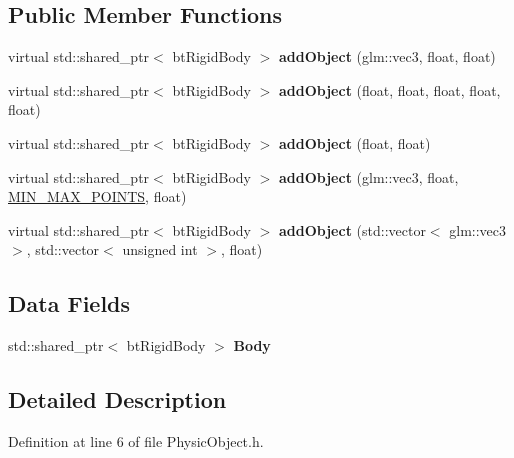 \subsection*{Public Member Functions}
\begin{DoxyCompactItemize}
\item 
virtual std\+::shared\+\_\+ptr$<$ bt\+Rigid\+Body $>$ {\bfseries add\+Object} (glm\+::vec3, float, float)\hypertarget{class_physics_1_1_physic_object_a64f5181be092b85b1f34bf542b94780a}{}\label{class_physics_1_1_physic_object_a64f5181be092b85b1f34bf542b94780a}

\item 
virtual std\+::shared\+\_\+ptr$<$ bt\+Rigid\+Body $>$ {\bfseries add\+Object} (float, float, float, float, float)\hypertarget{class_physics_1_1_physic_object_a0cff2f47921a688ca5d1355075a94a40}{}\label{class_physics_1_1_physic_object_a0cff2f47921a688ca5d1355075a94a40}

\item 
virtual std\+::shared\+\_\+ptr$<$ bt\+Rigid\+Body $>$ {\bfseries add\+Object} (float, float)\hypertarget{class_physics_1_1_physic_object_a2a57f444c58cbe27ed873ed64bf2efaa}{}\label{class_physics_1_1_physic_object_a2a57f444c58cbe27ed873ed64bf2efaa}

\item 
virtual std\+::shared\+\_\+ptr$<$ bt\+Rigid\+Body $>$ {\bfseries add\+Object} (glm\+::vec3, float, \hyperlink{struct_m_i_n___m_a_x___p_o_i_n_t_s}{M\+I\+N\+\_\+\+M\+A\+X\+\_\+\+P\+O\+I\+N\+TS}, float)\hypertarget{class_physics_1_1_physic_object_aee5783cf9855d98a6218f1311effb005}{}\label{class_physics_1_1_physic_object_aee5783cf9855d98a6218f1311effb005}

\item 
virtual std\+::shared\+\_\+ptr$<$ bt\+Rigid\+Body $>$ {\bfseries add\+Object} (std\+::vector$<$ glm\+::vec3 $>$, std\+::vector$<$ unsigned int $>$, float)\hypertarget{class_physics_1_1_physic_object_a0d5b59e9e2f115c57f7f6cbe2149d3cd}{}\label{class_physics_1_1_physic_object_a0d5b59e9e2f115c57f7f6cbe2149d3cd}

\end{DoxyCompactItemize}
\subsection*{Data Fields}
\begin{DoxyCompactItemize}
\item 
std\+::shared\+\_\+ptr$<$ bt\+Rigid\+Body $>$ {\bfseries Body}\hypertarget{class_physics_1_1_physic_object_abd712db1dea4d1071cb272a3d25ac905}{}\label{class_physics_1_1_physic_object_abd712db1dea4d1071cb272a3d25ac905}

\end{DoxyCompactItemize}


\subsection{Detailed Description}


Definition at line 6 of file Physic\+Object.\+h.

